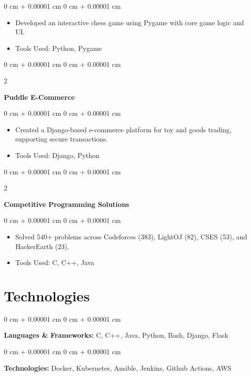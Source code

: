 \documentclass[10pt, letterpaper]{article}
\newenvironment{highlights}{
	\begin{itemize}[
		topsep=0.10 cm,
		parsep=0.10 cm,
		partopsep=0pt,
		itemsep=0pt,
		leftmargin=0 cm + 10pt
		]
	}{
	\end{itemize}
} %
\newenvironment{onecolentry}{
	\begin{adjustwidth}{
			0 cm + 0.00001 cm
		}{
			0 cm + 0.00001 cm
		}
	}{
	\end{adjustwidth}
} %
\newenvironment{twocolentry}[2][]{
	\onecolentry
	\def\secondColumn{#2}
	\setcolumnwidth{\fill, 4.5 cm}
	\begin{paracol}{2}
	}{
		\switchcolumn \raggedleft \secondColumn
	\end{paracol}
	\endonecolentry
} %
\begin{document}
	\vspace{0.10 cm}
	\begin{onecolentry}
		\begin{highlights}
			\item Developed an interactive chess game using Pygame with core game logic and UI.
			\item Tools Used: Python, Pygame
		\end{highlights}
	\end{onecolentry}

	\vspace{0.2cm}
	\begin{twocolentry}{
			\href{https://github.com/sudiptarathi2020/puddle}{{\faGithub}}
		}
		\textbf{Puddle E-Commerce}\end{twocolentry}
	\vspace{0.10cm}
	\begin{onecolentry}
		\begin{highlights}
			\item Created a Django-based e-commerce platform for toy and goods trading, supporting secure transactions.
			\item Tools Used: Django, Python
		\end{highlights}
	\end{onecolentry}

	\vspace{0.2cm}
	\begin{twocolentry}
		{
			\href{https://github.com/sudiptarathi2020/puddle}{{\faGithub}}
		}
		
		\textbf{Competitive Programming Solutions}
	\end{twocolentry}
	\vspace{0.10cm}
	\begin{onecolentry}
		\begin{highlights}
			\item Solved 540+ problems across Codeforces (383), LightOJ (82), CSES (53), and HackerEarth (23).
			\item Tools Used: C, C++, Java
		\end{highlights}
	\end{onecolentry}

	
	
	
	
	
	\section{Technologies}
	
	
	
	
	\begin{onecolentry}
        \textbf{Languages \& Frameworks:} C, C++, Java, Python, Bash, Django, Flask
	\end{onecolentry}
	
	\vspace{0.2 cm}
	
	\begin{onecolentry}
		\textbf{Technologies:} Docker, Kubernetes, Ansible, Jenkins, Github Actions, AWS
	\end{onecolentry}

	
	
\end{document}
